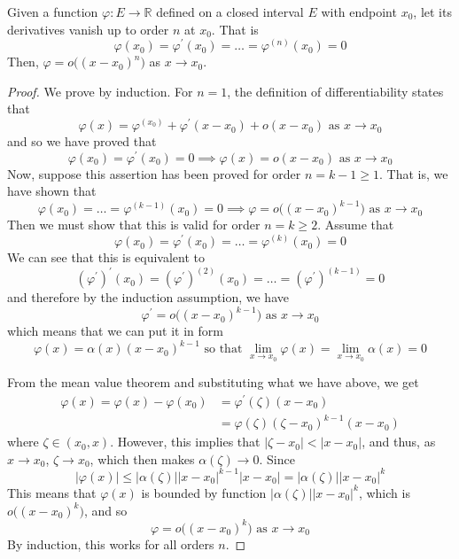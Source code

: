     \begin{lemma}
      Given a function $\varphi: E \longrightarrow \mathbb{R}$ defined on a closed interval $E$ with endpoint $x_0$, let its derivatives vanish up to order $n$ at $x_0$. That is
      \[\varphi(x_0) = \varphi^\prime (x_0) = \ldots = \varphi^{(n)} (x_0) = 0\]
      Then, $\varphi = o\big((x - x_0)^n\big)$ as $x \rightarrow x_0$. 
    \end{lemma}
    \begin{proof}
    We prove by induction. For $n = 1$, the definition of differentiability states that 
    \[\varphi(x) = \varphi^(x_0) + \varphi^\prime (x - x_0) + o(x - x_0) \text{ as } x \rightarrow x_0\]
    and so we have proved that 
    \[\varphi(x_0) = \varphi^\prime (x_0) = 0 \implies \varphi(x) = o(x - x_0) \text{ as } x \rightarrow x_0\]
    Now, suppose this assertion has been proved for order $n = k - 1 \geq 1$. That is, we have shown that 
    \[\varphi(x_0) = \ldots = \varphi^{(k-1)}(x_0) = 0 \implies \varphi= o\big((x - x_0)^{k-1}\big) \text{ as } x \rightarrow x_0\]
    Then we must show that this is valid for order $n = k \geq 2$. Assume that 
    \[\varphi(x_0) = \varphi^\prime (x_0) = \ldots = \varphi^{(k)} (x_0) = 0\]
    We can see that this is equivalent to
    \[(\varphi^\prime)^\prime (x_0) = (\varphi^\prime)^{(2)} (x_0) = \ldots = (\varphi^\prime)^{(k-1)} = 0\]
    and therefore by the induction assumption, we have
    \[\varphi^\prime = o\big( (x - x_0)^{k-1}\big) \text{ as } x \rightarrow x_0\]
    which means that we can put it in form 
    \[\varphi(x) = \alpha (x) (x - x_0)^{k-1} \text{ so that } \lim_{x \rightarrow x_0} \varphi(x) = \lim_{x \rightarrow x_0} \alpha(x) = 0 \]

    From the mean value theorem and substituting what we have above, we get 
    \begin{align*}
        \varphi(x) = \varphi(x) - \varphi(x_0) & = \varphi^\prime(\zeta) (x - x_0) \\
        & = \varphi (\zeta) (\zeta - x_0)^{k-1} (x - x_0)
    \end{align*}
    where $\zeta \in (x_0, x)$. However, this implies that $|\zeta - x_0| < |x - x_0|$, and thus, as $x \rightarrow x_0$, $\zeta \rightarrow x_0$, which then makes $\alpha(\zeta) \rightarrow 0$. Since
    \[|\varphi (x)| \leq |\alpha(\zeta)| |x - x_0|^{k-1} |x - x_0| = |\alpha(\zeta)| |x - x_0|^k\]
    This means that $\varphi(x)$ is bounded by function $|\alpha(\zeta)| |x - x_0|^k$, which is $o\big((x-x_0)^k\big)$, and so 
    \[\varphi = o\big( (x - x_0)^k \big) \text{ as } x \rightarrow x_0\]
    By induction, this works for all orders $n$. 
    \end{proof}

